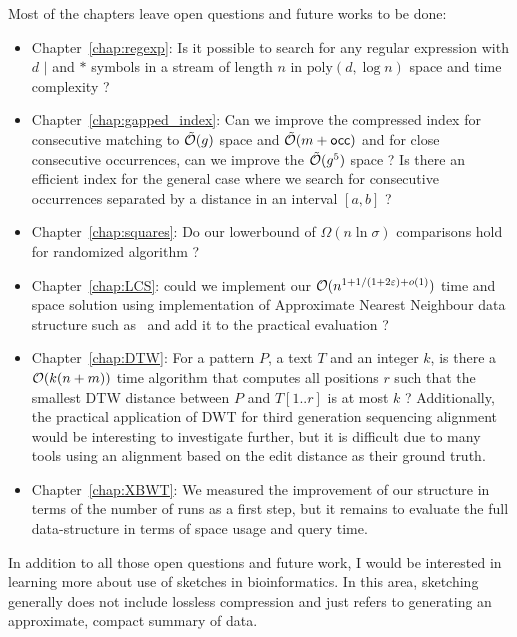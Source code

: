 %
Most of the chapters leave open questions and future works to be done:
\begin{itemize}
    \item Chapter~\ref{chap:regexp}: Is it possible to search for any regular expression with $d$ $|$ and $\ast$ symbols in a stream of length $n$ in $\mathrm{poly}(d,\log n)$ space and time complexity ?
    \item Chapter~\ref{chap:gapped_index}: Can we improve the compressed index for consecutive matching to $\tilde{\mathcal{O}}(g)$ space and $\tilde{\mathcal{O}}(m+\mathsf{occ})$ and for close consecutive occurrences, can we improve the $\tilde{\mathcal{O}}(g^5)$ space ? Is there an efficient index for the general case where we search for consecutive occurrences separated by a distance in an interval $[a,b]$ ?
    \item Chapter~\ref{chap:squares}: Do our lowerbound of $\Omega(n\ln \sigma)$ comparisons hold for randomized algorithm ?
    \item Chapter~\ref{chap:LCS}: could we implement our $\mathcal{O}(n^{1+ 1/(1+2\varepsilon) + o(1)})$ time and space solution using implementation of Approximate Nearest Neighbour data structure such as~\cite{} and add it to the practical evaluation ?
    \item Chapter~\ref{chap:DTW}: For a pattern $P$, a text $T$ and an integer $k$, is there a $\mathcal{O}(k(n+m))$ time algorithm that computes all positions $r$ such that the smallest DTW distance between $P$ and $T[1..r]$ is at most $k$ ? Additionally, the practical application of DWT for third generation sequencing alignment would be interesting to investigate further, but it is difficult due to many tools using an alignment based on the edit distance as their ground truth.    
    \item Chapter~\ref{chap:XBWT}: We measured the improvement of our structure in terms of the number of runs as a first step, but it remains to evaluate the full data-structure in terms of space usage and query time.
\end{itemize}
%
In addition to all those open questions and future work, I would be interested in learning more about use of sketches in bioinformatics. In this area, sketching generally does not include lossless compression and just refers to generating an approximate, compact summary of data.
% 

\backmatter